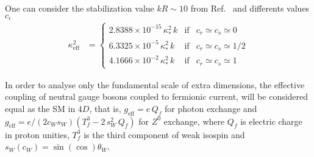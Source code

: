 One can consider the stabilization value $kR\sim10$ from Ref.~\cite{Goldberger:1999uk} and differents values $c_i$
\begin{align}
\kappa_{\text{eff}}^2 &= \left\{ \begin{matrix}
                           2.8388\times10^{-15}\,\kappa_*^2\,k & \text{if} & c_r\simeq c_s\simeq 0 \\
                           6.3325\times10^{-5}\,\kappa_*^2\,k & \text{if} & c_r\simeq c_s\simeq 1/2 \\
                           4.1666\times10^{-2}\,\kappa_*^2\,k & \text{if} & c_r\simeq c_s\simeq 1 
                          \end{matrix} \right.
\end{align}

In order to analyse only the fundamental scale of extra dimensions, the effective coupling of neutral gauge bosons coupled to fermionic current, will be considered equal as the SM in $4D$, that is, $g_{\text{eff}} = e\,Q_f$ for photon exchange and $g_{\text{eff}} = e/(2c_Ws_W)\left(T^3_f - 2\,s_W^2\,Q_f\right)$ for $Z^0$ exchange, where $Q_f$ is electric charge in proton unities, $T_f^3$ is the third component of weak isospin and $s_W(c_W) = \sin(\cos)\theta_W$. 





